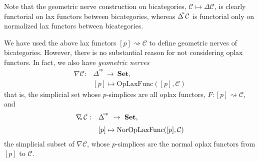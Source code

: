 \documentclass[]{amsart}
\begin{document}
Note   that the geometric nerve construction on bicategories, ${\ensuremath{\mathcal{C}}}\mapsto \Delta {\ensuremath{\mathcal{C}}}$, is clearly
functorial on lax functors between bicategories,  whereas $\Delta^{\hspace{-2pt}^\mathrm{u}}{\ensuremath{\mathcal{C}}}$ is
functorial only on normalized lax functors between bicategories.

We have used the above lax functors $[p]\rightsquigarrow {\ensuremath{\mathcal{C}}}$ to define geometric nerves of
bicategories. However, there is no substantial reason for not considering  oplax functors. In fact,
we also have {\em geometric nerves}
\begin{equation}\label{ogn} \begin{array}{ll}\nabla{\ensuremath{\mathcal{C}}}:&\Delta^{\!^{\mathrm{op}}}\ \to \ {\ensuremath{\mathbf{Set}}},\\[6pt]
&[p]\mapsto {\ensuremath{\mathrm{OpLaxFunc}}}([p],{\ensuremath{\mathcal{C}}})\end{array}\end{equation} that is, the
simplicial set whose $p$-simplices are all oplax functors, ${F:[p]\rightsquigarrow {\ensuremath{\mathcal{C}}}}$, and
\begin{equation}\label{ongn} \begin{array}{ll}\nabla\hspace{-2.5pt}_{^{_\mathrm{u}}}{\ensuremath{\mathcal{C}}}:&\Delta^{\!^{\mathrm{op}}}\ \to \ {\ensuremath{\mathbf{Set}}},\\[6pt]
&[p]\mapsto \mathrm{NorOpLaxFunc}([p],{\ensuremath{\mathcal{C}}})\end{array}\end{equation}
 the simplicial subset of $\nabla{\ensuremath{\mathcal{C}}}$,  whose $p$-simplices are the normal oplax functors from $[p]$ to ${\ensuremath{\mathcal{C}}}$.
\end{document}
